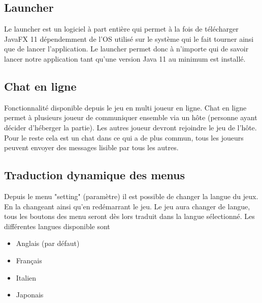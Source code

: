 \subsection{Launcher}
Le launcher est un logiciel à part entière qui permet à la fois de télécharger JavaFX 11 dépendemment de l'OS utilisé sur le système qui le fait tourner ainsi que de lancer l'application. Le launcher permet donc à n'importe qui de savoir lancer 
notre application tant qu'une version Java 11 au minimum est installé.  
\subsection{Chat en ligne}
Fonctionnalité disponible depuis le jeu en multi joueur en ligne. Chat en ligne permet à plusieurs joueur de communiquer ensemble via un hôte (personne ayant décider d'héberger la partie). Les autres joueur devront rejoindre le jeu de l'hôte. 
Pour le reste cela est un chat dans ce qui a de plus commun, tous les joueurs peuvent envoyer des messages lisible par tous les autres. 
\subsection{Traduction dynamique des menus}
Depuis le menu "setting" (paramètre) il est possible de changer la langue du jeux. En la changeant ainsi qu'en redémarrant le jeu. Le jeu aura changer de langue, tous les boutons des menu seront dès lors traduit dans la langue sélectionné.
Les différentes langues disponible sont 
\begin{itemize}
	\item Anglais (par défaut)
	\item Français
	\item Italien
	\item Japonais
\end{itemize} 